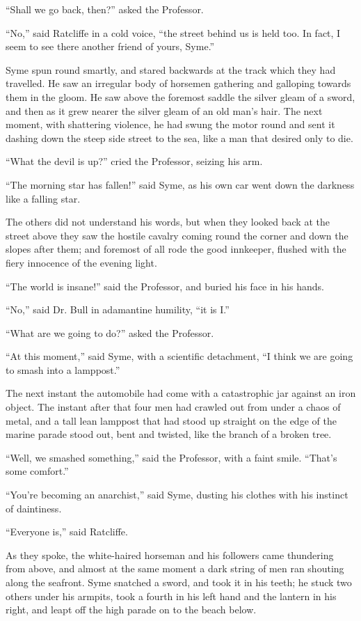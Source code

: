 “Shall we go back, then?” asked the Professor.

“No,” said Ratcliffe in a cold voice, “the street behind us is held too. In fact, I seem to see there another friend of yours, Syme.”

Syme spun round smartly, and stared backwards at the track which they had travelled. He saw an irregular body of horsemen gathering and galloping towards them in the gloom. He saw above the foremost saddle the silver gleam of a sword, and then as it grew nearer the silver gleam of an old man’s hair. The next moment, with shattering violence, he had swung the motor round and sent it dashing down the steep side street to the sea, like a man that desired only to die.

“What the devil is up?” cried the Professor, seizing his arm.

“The morning star has fallen!” said Syme, as his own car went down the darkness like a falling star.

The others did not understand his words, but when they looked back at the street above they saw the hostile cavalry coming round the corner and down the slopes after them; and foremost of all rode the good innkeeper, flushed with the fiery innocence of the evening light.

“The world is insane!” said the Professor, and buried his face in his hands.

“No,” said Dr. Bull in adamantine humility, “it is I.”

“What are we going to do?” asked the Professor.

“At this moment,” said Syme, with a scientific detachment, “I think we are going to smash into a lamppost.”

The next instant the automobile had come with a catastrophic jar against an iron object. The instant after that four men had crawled out from under a chaos of metal, and a tall lean lamppost that had stood up straight on the edge of the marine parade stood out, bent and twisted, like the branch of a broken tree.

“Well, we smashed something,” said the Professor, with a faint smile. “That’s some comfort.”

“You’re becoming an anarchist,” said Syme, dusting his clothes with his instinct of daintiness.

“Everyone is,” said Ratcliffe.

As they spoke, the white-haired horseman and his followers came thundering from above, and almost at the same moment a dark string of men ran shouting along the seafront. Syme snatched a sword, and took it in his teeth; he stuck two others under his armpits, took a fourth in his left hand and the lantern in his right, and leapt off the high parade on to the beach below.

